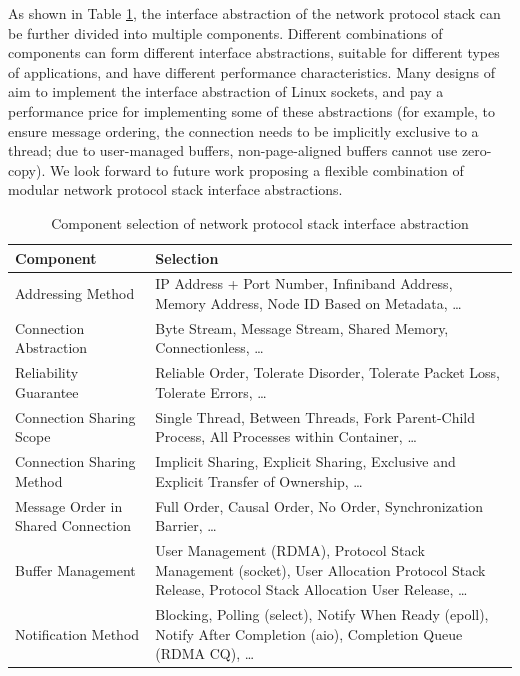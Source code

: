 As shown in Table \ref{socksdirect:tab:api-components}, the interface abstraction of the network protocol stack can be further divided into multiple components. Different combinations of components can form different interface abstractions, suitable for different types of applications, and have different performance characteristics. Many designs of \sys{} aim to implement the interface abstraction of Linux sockets, and pay a performance price for implementing some of these abstractions (for example, to ensure message ordering, the connection needs to be implicitly exclusive to a thread; due to user-managed buffers, non-page-aligned buffers cannot use zero-copy). We look forward to future work proposing a flexible combination of modular network protocol stack interface abstractions.

\begin{table}[htbp]
	\centering
	\caption{Component selection of network protocol stack interface abstraction}
	\small
	\begin{tabular}{l|p{}}
		\hline
		Component & Selection \\
		\hline
		Addressing Method & IP Address + Port Number, Infiniband Address, Memory Address, Node ID Based on Metadata, \ldots \\
		Connection Abstraction & Byte Stream, Message Stream, Shared Memory, Connectionless, \ldots \\
		Reliability Guarantee & Reliable Order, Tolerate Disorder, Tolerate Packet Loss, Tolerate Errors, \ldots \\
		Connection Sharing Scope & Single Thread, Between Threads, Fork Parent-Child Process, All Processes within Container, \ldots \\
		Connection Sharing Method & Implicit Sharing, Explicit Sharing, Exclusive and Explicit Transfer of Ownership, \ldots \\
		Message Order in Shared Connection & Full Order, Causal Order, No Order, Synchronization Barrier, \ldots \\
		Buffer Management & User Management (RDMA), Protocol Stack Management (socket), User Allocation Protocol Stack Release, Protocol Stack Allocation User Release, \ldots \\
		Notification Method & Blocking, Polling (select), Notify When Ready (epoll), Notify After Completion (aio), Completion Queue (RDMA CQ), \ldots \\
		\hline
	\end{tabular}
	\label{socksdirect:tab:api-components}
\end{table}

